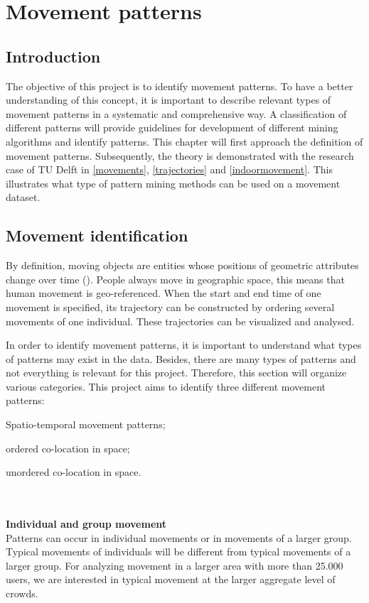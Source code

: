 \chapter{Movement patterns}\label{movementpatterns}

\section{Introduction}
The objective of this project is to identify movement patterns. To have a better understanding of this concept, it is important to describe relevant types of movement patterns in a systematic and comprehensive way. A classification of different patterns will provide guidelines for development of different mining algorithms and identify patterns. This chapter will first approach the definition of movement patterns. Subsequently, the theory is demonstrated with the research case of TU Delft in \autoref{movements}, \autoref{trajectories} and \autoref{indoormovement}. This illustrates what type of pattern mining methods can be used on a movement dataset. 

\section{Movement identification}
By definition, moving objects are entities whose positions of geometric attributes change over time (\citep{dodge2008towards}). People always move in geographic space, this means that human movement is geo-referenced. When the start and end time of one movement is specified, its trajectory can be constructed by ordering several movements of one individual. These trajectories can be visualized and analysed.

In order to identify movement patterns, it is important to understand what types of patterns may exist in the data. Besides, there are many types of patterns and not everything is relevant for this project. Therefore, this section will organize various categories. This project aims to identify three different movement patterns: \begin {enumerate*} [label=\itshape\arabic*\upshape),font={\color{red!0!black}\bfseries}] \item Spatio-temporal movement patterns; \item ordered co-location in space; \item unordered co-location in space. \end {enumerate*}\\\\
\textbf{Individual and group movement}\\
Patterns can occur in individual movements or in movements of a larger group. Typical movements of individuals will be different from typical movements of a larger group. For analyzing movement in a larger area with more than 25.000 users, we are interested in typical movement at the larger aggregate level of crowds. 

